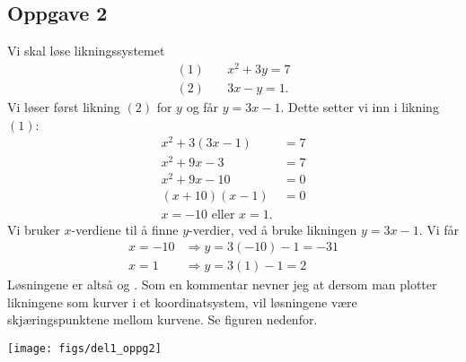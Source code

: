 \subsection*{Oppgave 2}
Vi skal løse likningssystemet
\begin{align*}
	(1) \quad & x^2 + 3y = 7 \\	
	(2) \quad & 3x - y = 1.
\end{align*}
Vi løser først likning $(2)$ for $y$ og får $y = 3x - 1$.
Dette setter vi inn i likning $(1)$:
\begin{align*}
	x^2 + 3 \left( 3x - 1\right) &= 7 \\
	x^2 + 9x - 3 &= 7 \\
	x^2 + 9x - 10 &= 0 \\
	(x + 10)(x - 1) &= 0 \\
	x = -10 \text{ eller } x = 1.
\end{align*}
Vi bruker $x$-verdiene til å finne $y$-verdier, ved å bruke likningen $y = 3x - 1$. Vi får
\begin{align*}
	x = -10 & \Rightarrow y = 3(-10) - 1 = -31 \\
	x = 1 \quad \ & \Rightarrow y = 3(1) - 1 = 2
\end{align*}
Løsningene er altså  og . Som en kommentar nevner jeg at dersom man plotter likningene som kurver i et koordinatsystem, vil løsningene være skjæringspunktene mellom kurvene. Se figuren nedenfor.

\begin{center}
	\texttt{[image: figs/del1\_oppg2]}
\end{center}

